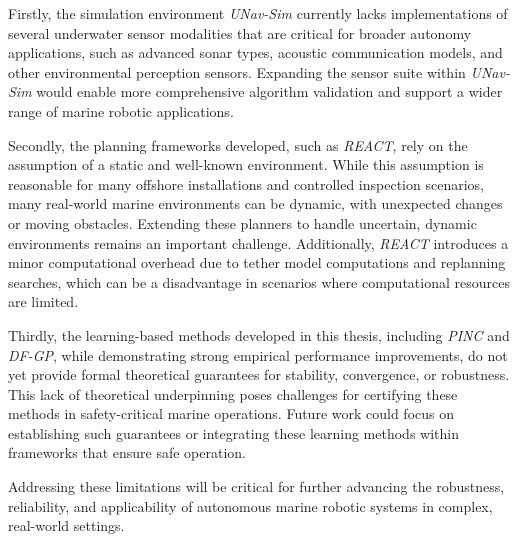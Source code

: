 Firstly, the simulation environment \textit{UNav-Sim} currently lacks implementations of several underwater sensor modalities that are critical for broader autonomy applications, such as advanced sonar types, acoustic communication models, and other environmental perception sensors. Expanding the sensor suite within \textit{UNav-Sim} would enable more comprehensive algorithm validation and support a wider range of marine robotic applications.

Secondly, the planning frameworks developed, such as \textit{REACT}, rely on the assumption of a static and well-known environment. While this assumption is reasonable for many offshore installations and controlled inspection scenarios, many real-world marine environments can be dynamic, with unexpected changes or moving obstacles. Extending these planners to handle uncertain, dynamic environments remains an important challenge. Additionally, \textit{REACT} introduces a minor computational overhead due to tether model computations and replanning searches, which can be a disadvantage in scenarios where computational resources are limited.

Thirdly, the learning-based methods developed in this thesis, including \textit{PINC} and \textit{DF-GP}, while demonstrating strong empirical performance improvements, do not yet provide formal theoretical guarantees for stability, convergence, or robustness. This lack of theoretical underpinning poses challenges for certifying these methods in safety-critical marine operations. Future work could focus on establishing such guarantees or integrating these learning methods within frameworks that ensure safe operation.

Addressing these limitations will be critical for further advancing the robustness, reliability, and applicability of autonomous marine robotic systems in complex, real-world settings.
